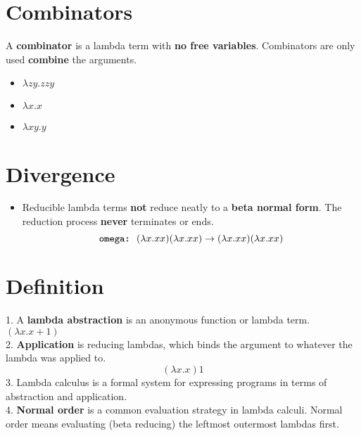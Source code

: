 \documentclass{article}
\newcounter{Def}[section]
\begin{document}
\section{Combinators}

A \textbf{combinator} is a lambda term with \textbf{no free variables}. Combinators are only
used \textbf{combine} the arguments. 
\begin{multicols}{3}
  \begin{itemize} \renewcommand\labelitemi{\small \textcolor{Lavender}{$\blacksquare$}}
    \item $\lambda zy . zzy$ 
    \item $\lambda x. x$
    \item $\lambda xy. y$      
  \end{itemize}
\end{multicols}

\section{Divergence}
\begin{itemize} \renewcommand\labelitemi{\small \textcolor{Lavender}{$\blacksquare$}}
  \item Reducible lambda terms \textbf{not} reduce neatly to a \textbf{beta normal form}. The reduction process \textbf{never} terminates or ends.
\[ \text{{\fontfamily{cmtt}\selectfont omega:}} \ \  (\lambda x.xx)(\lambda x.xx) \to (\lambda x.xx)(\lambda x.xx) \]  
\end{itemize}

\section{Definition}
1. A \textbf{lambda abstraction} is an anonymous function or lambda term. $(\lambda x. x+1)$\\
2. \textbf{Application} is reducing lambdas, which binds the argument to whatever the lambda 
was applied to.
\begin{equation*}
    (\lambda x.x) 1
\end{equation*}
3. Lambda calculus is a formal system for expressing programs in terms of abstraction
and application.\\
4. \textbf{Normal order} is a common evaluation strategy in lambda calculi. 
Normal order means evaluating (beta reducing) the leftmost outermost lambdas first.
    
\end{document}
